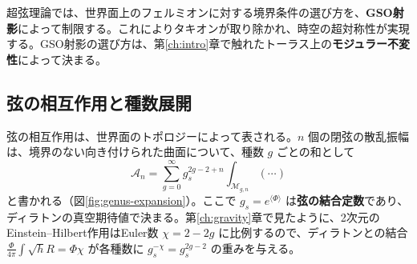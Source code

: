 \documentclass[uplatex, dvipdfmx, book]{jsbook}
\let\origsubsection\subsection
\let\origsubsubsection\subsubsection
\renewcommand{\section}{\origsubsection}
\renewcommand{\subsection}{\origsubsubsection}
\renewcommand{\subsubsection}{\paragraph}
\begin{document}
超弦理論では、世界面上のフェルミオンに対する境界条件の選び方を、\textbf{GSO射影}によって制限する。これによりタキオンが取り除かれ、時空の超対称性が実現する。GSO射影の選び方は、第\ref{ch:intro}章で触れたトーラス上の\textbf{モジュラー不変性}によって決まる。

\section{弦の相互作用と種数展開}

弦の相互作用は、世界面のトポロジーによって表される。$n$ 個の閉弦の散乱振幅は、境界のない向き付けられた曲面について、種数 $g$ ごとの和として
\begin{equation}
    \mathcal{A}_n = \sum_{g = 0}^{\infty} g_s^{2g - 2 + n} \int_{\mathcal{M}_{g,n}} (\cdots)
\end{equation}
と書かれる（図\ref{fig:genus-expansion}）。ここで $g_s = e^{\langle\Phi\rangle}$ は\textbf{弦の結合定数}であり、ディラトンの真空期待値で決まる。第\ref{ch:gravity}章で見たように、2次元のEinstein--Hilbert作用はEuler数 $\chi = 2 - 2g$ に比例するので、ディラトンとの結合 $\frac{\Phi}{4\pi}\int\sqrt{h}R = \Phi\chi$ が各種数に $g_s^{-\chi} = g_s^{2g - 2}$ の重みを与える。
\end{document}
